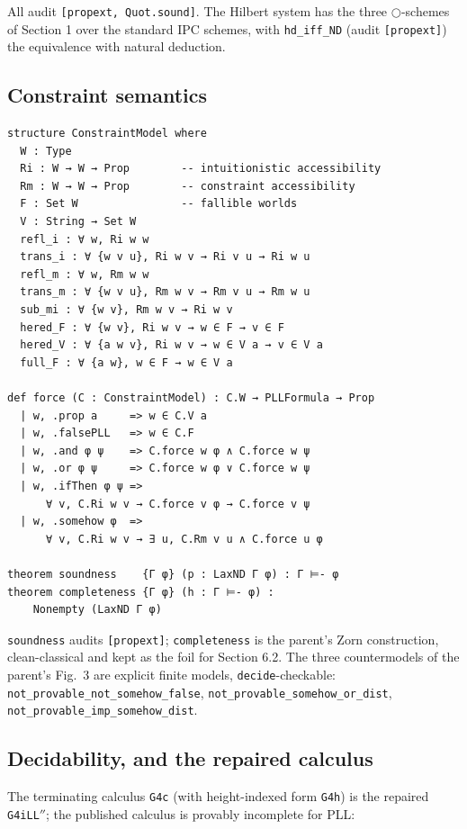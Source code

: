 \noindent All audit \texttt{[propext, Quot.sound]}. The Hilbert system
has the three \ensuremath{\bigcirc}-schemes of Section 1 over the standard IPC
schemes, with \texttt{hd\_iff\_ND} (audit \texttt{[propext]}) the
equivalence with natural deduction.

\subsection{Constraint semantics}

\begin{lstlisting}
structure ConstraintModel where
  W : Type
  Ri : W → W → Prop        -- intuitionistic accessibility
  Rm : W → W → Prop        -- constraint accessibility
  F : Set W                -- fallible worlds
  V : String → Set W
  refl_i : ∀ w, Ri w w
  trans_i : ∀ {w v u}, Ri w v → Ri v u → Ri w u
  refl_m : ∀ w, Rm w w
  trans_m : ∀ {w v u}, Rm w v → Rm v u → Rm w u
  sub_mi : ∀ {w v}, Rm w v → Ri w v
  hered_F : ∀ {w v}, Ri w v → w ∈ F → v ∈ F
  hered_V : ∀ {a w v}, Ri w v → w ∈ V a → v ∈ V a
  full_F : ∀ {a w}, w ∈ F → w ∈ V a

def force (C : ConstraintModel) : C.W → PLLFormula → Prop
  | w, .prop a     => w ∈ C.V a
  | w, .falsePLL   => w ∈ C.F
  | w, .and φ ψ    => C.force w φ ∧ C.force w ψ
  | w, .or φ ψ     => C.force w φ ∨ C.force w ψ
  | w, .ifThen φ ψ =>
      ∀ v, C.Ri w v → C.force v φ → C.force v ψ
  | w, .somehow φ  =>
      ∀ v, C.Ri w v → ∃ u, C.Rm v u ∧ C.force u φ

theorem soundness    {Γ φ} (p : LaxND Γ φ) : Γ ⊨- φ
theorem completeness {Γ φ} (h : Γ ⊨- φ) :
    Nonempty (LaxND Γ φ)
\end{lstlisting}

\noindent \texttt{soundness} audits \texttt{[propext]};
\texttt{completeness} is the parent's Zorn construction, clean-classical
and kept as the foil for Section 6.2. The three countermodels of the
parent's Fig.~3 are explicit finite models, \texttt{decide}-checkable:
\texttt{not\_provable\_not\_somehow\_false},
\texttt{not\_provable\_somehow\_or\_dist},
\texttt{not\_provable\_imp\_somehow\_dist}.

\subsection{Decidability, and the repaired calculus}

The terminating calculus \texttt{G4c} (with height-indexed form
\texttt{G4h}) is the repaired \texttt{G4iLL\ensuremath{{}''}}; the published
calculus is provably incomplete for PLL:

